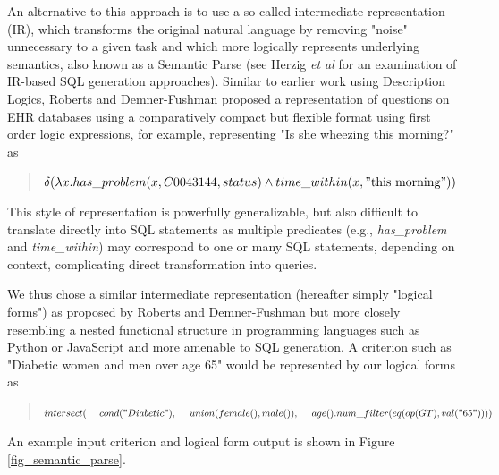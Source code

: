 \documentclass[../main.tex]{subfiles}
\begin{document}
An alternative to this approach is to use a so-called intermediate representation (IR), which transforms the original natural language by removing "noise" unnecessary to a given task and which more logically represents underlying semantics, also known as a Semantic Parse \cite{kamathsurvey} (see Herzig \textit{et al} \cite{herzig2021unlocking} for an examination of IR-based SQL generation approaches). Similar to earlier work using Description Logics, Roberts and Demner-Fushman \cite{roberts2016annotating} proposed a representation of questions on EHR databases using a comparatively compact but flexible format using first order logic expressions, for example, representing "Is she wheezing this morning?" as

\begin{quote}
    \centering
    $\delta( \lambda x.has\_problem(x, C0043144, status) \wedge time\_within(x, \mathrm{"this\ morning"}))$
\end{quote}

\noindent This style of representation is powerfully generalizable, but also difficult to translate directly into SQL statements as multiple predicates (e.g., \textit{has\_problem} and \textit{time\_within}) may correspond to one or many SQL statements, depending on context, complicating direct transformation into queries.

We thus chose a similar intermediate representation (hereafter simply "logical forms") as proposed by Roberts and Demner-Fushman but more closely resembling a nested functional structure in programming languages such as Python or JavaScript and more amenable to SQL generation. A criterion such as "Diabetic women and men over age 65" would be represented by our logical forms as

\begin{quote}
$intersect( \\
    \mathrm{\ \ \ \ }cond("Diabetic"), \\
    \mathrm{\ \ \ \ }union(female(), male()),\\
    \mathrm{\ \ \ \ }age().num\_filter(eq(op(GT), val("65"))) \\
)$
\end{quote}

\noindent An example input criterion and logical form output is shown in Figure \ref{fig_semantic_parse}.
\end{document}
